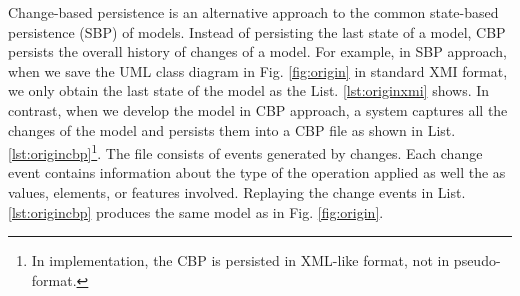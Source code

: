 \documentclass{llncs}
\begin{document}
\vspace{-5pt}
Change-based persistence is an alternative approach to the common state-based persistence (SBP) of models. Instead of persisting the last state of a model, CBP persists the overall history of changes of a model. For example, in SBP approach, when we save the UML class diagram in Fig. \ref{fig:origin} in standard XMI format, we only obtain the last state of the model as the List. \ref{lst:originxmi} shows. In contrast, when we develop the model in CBP approach, a system captures all the changes of the model and persists them into a CBP file as shown in List. \ref{lst:origincbp}\footnote{In implementation, the CBP is persisted in XML-like format, not in pseudo-format.}. The file consists of events generated by changes. Each change event contains information about the type of the operation applied as well the as values, elements, or features involved. Replaying the change events in List. \ref{lst:origincbp} produces the same model as in Fig. \ref{fig:origin}.
\end{document}
